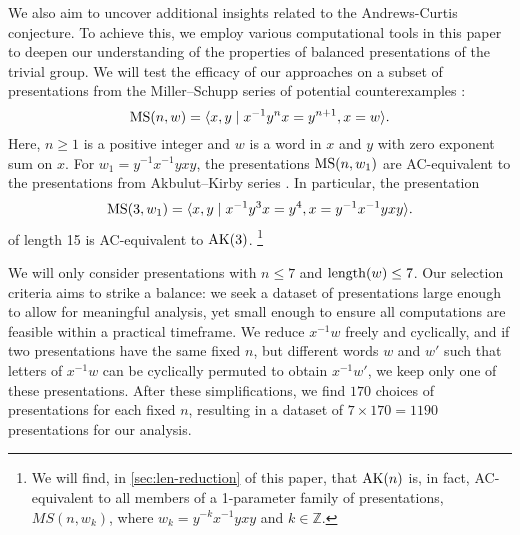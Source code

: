 We also aim to uncover additional insights related to the Andrews-Curtis conjecture. To achieve this, we employ various computational tools in this paper to deepen our understanding of the properties of balanced presentations of the trivial group.
We will test the efficacy of our approaches on a subset of presentations from the Miller--Schupp series of potential counterexamples \cite{Miller--Schupp}:
\[
\text{MS}(n, w) = \langle x, y \mid x^{-1} y^n x = y^{n+1}, x = w\rangle.
\]
Here, $n \ge 1$ is a positive integer and $w$ is a word in $x$ and $y$ with zero exponent sum on $x$.
For $w_1 = y^{-1} x^{-1} y x y$, the presentations $\text{MS}(n, w_1)$ are AC-equivalent to the presentations from Akbulut--Kirby series \cite{MMS}.
In particular, the presentation
\[
\text{MS}(3, w_1) = \langle x, y \mid x^{-1} y^3 x = y^{4}, x = y^{-1} x^{-1} y x y\rangle.
\]
of length 15 is AC-equivalent to $\text{AK}(3)$.
\footnote{We will find, in \autoref{sec:len-reduction} of this paper, that $\text{AK}(n)$ is, in fact, AC-equivalent to all members of a 1-parameter family of presentations, $MS(n, w_k)$, where $w_k = y^{-k} x^{-1} y x y$ and $k \in \mathbb{Z}$.}

We will only consider presentations with $n \leq 7$ and $\operatorname{length}(w) \leq 7$.
Our selection criteria aims to strike a balance: we seek a dataset of presentations large enough to allow for meaningful analysis, yet small enough to ensure all computations are feasible within a practical timeframe.
We reduce $x^{-1}w$ freely and cyclically, and if two presentations have the same fixed $n$, but different words $w$ and $w'$ such that letters of $x^{-1} w$ can be cyclically permuted to obtain $x^{-1} w'$, we keep only one of these presentations.
After these simplifications, we find $170$ choices of presentations for each fixed $n$, resulting in a dataset of $7 \times 170 = 1190$ presentations for our analysis.


